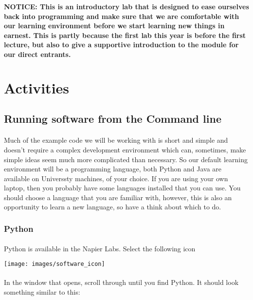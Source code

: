 \documentclass[10pt, a4paper, twosize]{article}
\begin{document}
\begin{framed}
{\bf{NOTICE:} This is an introductory lab that is designed to ease ourselves back into programming and make sure that we are comfortable with our learning environment before we start learning new things in earnest. This is partly because the first lab this year is before the first lecture, but also to give a supportive introduction to the module for our direct entrants.}  
\end{framed}


\section{Activities}

\subsection{Running software from the Command line}

\paragraph{} Much of the example code we will be working with is short and simple and doesn't require a complex development environment which can, sometimes, make simple ideas seem much more complicated than necessary. So our default learning environment will be a programming language, both Python and Java are available on Universsty machines, of your choice. If you are using your own laptop, then you probably have some languages installed that you can use. You should choose a language that you are familiar with, however, this is also an opportunity to learn a new language, so have a think about which to do.

\subsubsection{Python}
\paragraph{} Python is available in the Napier Labs. Select the following icon

\texttt{[image: images/software\_icon]}

\paragraph{} In the window that opens, scroll through until you find Python. It should look something similar to this:
\end{document}
